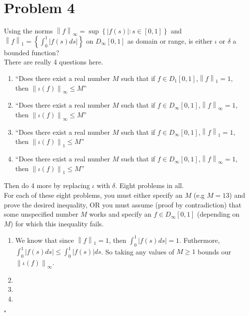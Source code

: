 \documentclass[11pt]{article}
\newcommand{\set}[1]{\left\{ #1\right\}}
\newcommand{\norm}[1]{\left\lVert#1\right\rVert}
\newenvironment{proof}{\noindent{\bf Proof.}}{\hfill $\square$\medskip}
\begin{document}
\section{Problem 4}
Using the norms $\norm{f}_{\infty}=\sup\set{|f(s)|:s\in[0,1]}$ and $\norm{f}_{1}=\set{\int_{0}^{1}|f(s)ds|}$ on 
$D_{\infty}[0,1]$ as domain or range, is either $\iota$ or $\delta$ a bounded function?\\
There are really 4 questions here.
\begin{enumerate}[label=\textbf{(\alph*)}]
    \item ``Does there exist a real number $M$ such that if $f\in D_{1}[0,1]$,$\norm{f}_{1}=1$, then 
    $\norm{\iota(f)}_{\infty}\leq M$''
    \item ``Does there exist a real number $M$ such that if $f\in D_{\infty}[0,1]$,$\norm{f}_{\infty}=1$, then 
    $\norm{\iota(f)}_{\infty}\leq M$''
    \item ``Does there exist a real number $M$ such that if $f\in D_{\infty}[0,1]$,$\norm{f}_{1}=1$, then 
    $\norm{\iota(f)}_{1}\leq M$''
    \item ``Does there exist a real number $M$ such that if $f\in D_{\infty}[0,1]$,$\norm{f}_{\infty}=1$, then 
    $\norm{\iota(f)}_{1}\leq M$''
\end{enumerate}
Then do 4 more by replacing $\iota$ with $\delta$. Eight problems in all.\\
For each of these eight problems, you must either specify an $M$ (e.g $M=13$) and prove the desired inequality, OR
you must assume (proof by contradiction) that some unspecified number $M$ works and specify an $f\in D_{\infty}[0,1]$
(depending on $M$) for which this inequality fails.

\begin{proof}
    \begin{enumerate}[label=\textbf{(\alph*)}]
        \item We know that since $\norm{f}_{1}=1$, then $\int_{0}^{1}|f(s)ds|=1$. Futhermore, $\int_{0}^{1}|f(s)ds|\leq\int_{0}^{1}|f(s)|ds$. So taking any values of $M\geq1$
        bounds our $\norm{\iota(f)}_{\infty}$.
        \item 
        \item 
        \item 
    \end{enumerate}
\end{proof}
\end{document}
